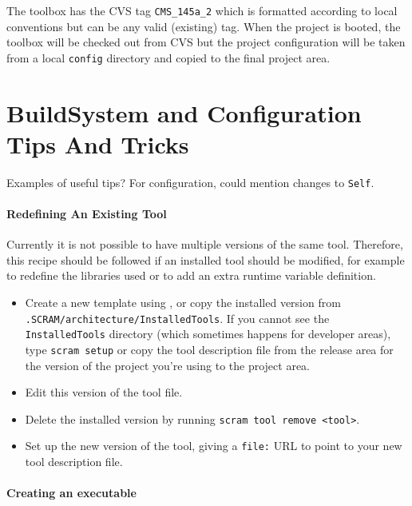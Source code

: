 \ni The toolbox has the CVS tag \texttt{CMS\_145a\_2} which is
formatted according to local conventions but can be any valid
(existing) tag. When the project is booted, the toolbox will be
checked out from CVS but the project configuration will be taken from
a local \texttt{config} directory and copied to the final project area.


\section{BuildSystem and Configuration Tips And Tricks}

Examples of useful tips? For configuration, could mention changes to \texttt{Self}.

\paragraph{Redefining An Existing Tool}

Currently it is not possible to have multiple versions of the same
tool. Therefore, this recipe should be followed if an installed tool
should be modified, for example to redefine the libraries used or to
add an extra runtime variable definition.

\begin{itemize}
\item Create a new template using \scram, or copy the installed version
  from \texttt{.SCRAM/architecture/InstalledTools}. If you cannot see
the \texttt{InstalledTools} directory (which sometimes happens for
developer areas), type \texttt{scram setup} or copy the tool description file
from the release area for the version of the project you're using to
the project area.

\item Edit this version of the tool file.

\item Delete the installed version by running \texttt{scram tool remove <tool>}.

\item Set up the new version of the tool, giving a \texttt{file:} URL to
  point to your new tool description file.
\end{itemize}

\paragraph{Creating an executable}

